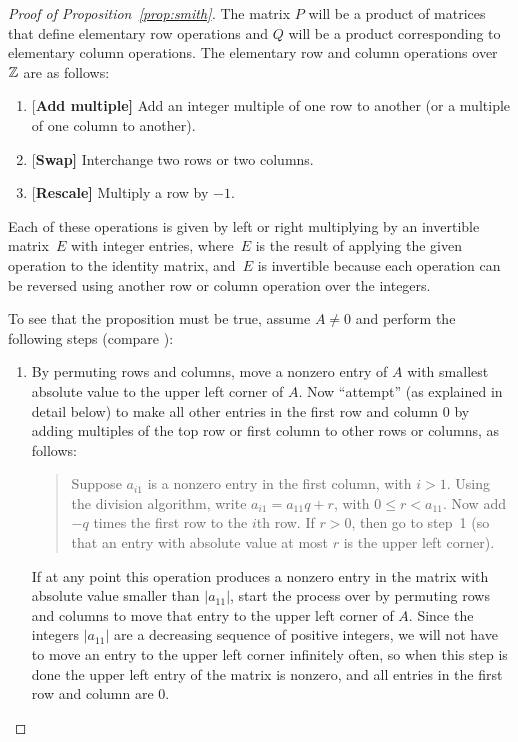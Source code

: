 \begin{proof}[Proof of Proposition~\ref{prop:smith}]  The matrix $P$ will be a product of matrices that define elementary
  row operations and $Q$ will be a product corresponding to elementary
  column operations.  The elementary row and column operations over
  $\mathbb{Z}$ are as follows:
\begin{enumerate}
\item{}{[\bf Add multiple]} Add an integer multiple of one row to another (or a multiple
of one column to another).
\item{}{[\bf Swap]} Interchange two rows or two columns.
\item{}{[\bf Rescale]} Multiply a row by $-1$.
\end{enumerate}
Each of these operations is given by left or right multiplying by an
invertible matrix~$E$ with integer entries, where~$E$ is the result of
applying the given operation to the identity matrix, and~$E$ is
invertible because each operation can be reversed using another row or
column operation over the integers.

To see that the proposition must be true, assume $A\neq 0$ and perform
the following steps (compare \cite[pg. 459]{artin:algebra}):
\begin{enumerate}
\item By permuting rows and columns, move a nonzero entry of $A$ with
  smallest absolute value to the upper left corner of $A$.  Now
  ``attempt'' (as explained in detail below) to make all other entries
  in the first row and column $0$ by adding multiples of the top row
  or first column to other rows or columns, as follows:
\begin{quote}
Suppose $a_{i1}$ is a nonzero entry in the first column, with
$i>1$.  Using the division algorithm, write $a_{i1} = a_{11}q + r$,
with $0\leq r < a_{11}$.  Now add $-q$ times the first row to the
$i$th row.  If $r>0$, then go to step~1 (so that an entry with
absolute value at most $r$ is the upper left corner).  
\end{quote}
  If at any point this operation produces a nonzero entry in the
  matrix with absolute value smaller than $|a_{11}|$, start the
  process over by permuting rows and columns to move that entry to the
  upper left corner of $A$.  Since the integers $|a_{11}|$ are a
  decreasing sequence of positive integers, we will not have to move
  an entry to the upper left corner infinitely often, so when this
  step is done the upper left entry of the matrix is nonzero, and all
  entries in the first row and column are 0.



\end{enumerate}
\end{proof}
